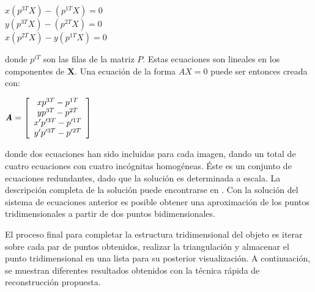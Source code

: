 \vspace{5 mm}
\begin{center}
$x(p^{3T}X) - (p^{1T}X) = 0$ \\
$y(p^{3T}X) - (p^{2T}X) = 0$ \\
$x(p^{2T}X) - y(p^{1T}X) = 0$
\end{center}
\vspace{5 mm}


donde $p^{iT}$ son las filas de la matriz $P$. Estas ecuaciones son lineales en los componentes de \textbf{X}. Una ecuaci\'{o}n de la forma $AX = 0$ puede ser entonces creada con:

\vspace{5 mm}
\begin{center}
$\textbf{\textit{A}} =
\left[ {
\begin{array}{*{20}c}
   xp^{3T} - p^{1T} \\
   yp^{3T} - p^{2T} \\
   x'p'^{3T} - p'^{1T} \\
   y'p'^{3T} - p'^{2T} \\
\end{array} 
} \right]$
\end{center}
\vspace{5 mm}

donde dos ecuaciones han sido incluidas para cada imagen, dando un total de cuatro ecuaciones con cuatro inc\'{o}gnitas homog\'{e}neas. \'{E}ste es un conjunto de ecuaciones redundantes, dado que la soluci\'{o}n es determinada a escala. La descripci\'{o}n completa de la soluci\'{o}n puede encontrarse en \cite{Hartley_Zisserman_2003}. Con la soluci\'{o}n del sistema de ecuaciones anterior es posible obtener una aproximaci\'{o}n de los puntos tridimensionales a partir de dos puntos bidimensionales. 

El proceso final para completar la estructura tridimensional del objeto es iterar sobre cada par de puntos obtenidos, realizar la triangulaci\'{o}n y almacenar el punto tridimensional en una lista para su posterior visualizaci\'{o}n. A continuaci\'{o}n, se muestran diferentes resultados obtenidos con la t\'{e}cnica r\'{a}pida de reconstrucci\'{o}n propuesta.


